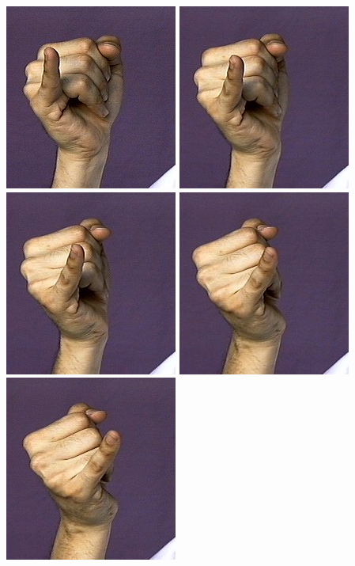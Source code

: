 \documentclass{article}
\begin{document}
\includegraphics[scale=0.5]{images/j5.jpg}
\includegraphics[scale=0.5]{images/j6.jpg}
\includegraphics[scale=0.5]{images/j7.jpg}
\includegraphics[scale=0.5]{images/j8.jpg}
\includegraphics[scale=0.5]{images/j9.jpg}
\end{document}
